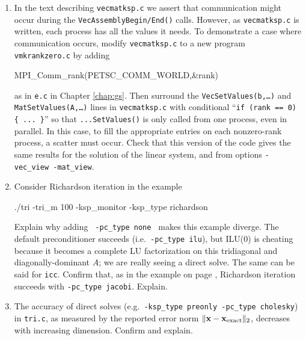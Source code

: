 \begin{enumerate}
\item \label{exer:ls:rankzerosetsall}  In the text describing \texttt{vecmatksp.c} we assert that communication might occur during the \texttt{VecAssemblyBegin/End()} calls.  However, as \texttt{vecmatksp.c} is written, each process has all the values it needs.  To demonstrate a case where communication occurs, modify \texttt{vecmatksp.c} to a new program \texttt{vmkrankzero.c} by adding
\begin{codeplain}
MPI_Comm_rank(PETSC_COMM_WORLD,&rank)
\end{codeplain}
as in \texttt{e.c} in Chapter \ref{chap:gs}.  Then surround the \texttt{VecSetValues(b,\dots)} and \texttt{MatSetValues(A,\dots)} lines in \texttt{vecmatksp.c} with conditional ``\verb|if (rank == 0) { ... }|'' so that \texttt{...SetValues()} is only called from one process, even in parallel.  In this case, to fill the appropriate entries on each nonzero-rank process, a scatter must occur.  Check that this version of the code gives the same results for the solution of the linear system, and from options \verb|-vec_view -mat_view|.

\item Consider Richardson iteration in the example
\begin{cline}
./tri -tri_m 100 -ksp_monitor -ksp_type richardson
\end{cline}
Explain why adding \texttt{ -pc\_type none } makes this example diverge.  The default preconditioner succeeds (i.e.~\texttt{-pc\_type ilu}), but ILU($0$) is cheating because it becomes a complete LU factorization on this tridiagonal and diagonally-dominant $A$; we are really seeing a direct solve.  The same can be said for \texttt{icc}.  Confirm that, as in the example on page \pageref{introprerichardson}, Richardson iteration succeeds with \texttt{-pc\_type jacobi}.  Explain.

\item The accuracy of direct solves (e.g.~\texttt{-ksp\_type preonly -pc\_type cholesky}) in \texttt{tri.c}, as measured by the reported error norm $\|\mathbf{x} - \mathbf{x}_{\text{exact}}\|_2$, decreases with increasing dimension.  Confirm and explain.


\end{enumerate}
